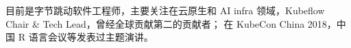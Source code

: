 

\begin{cvparagraph}
\begin{minipage}[t]{\textwidth}
目前是字节跳动软件工程师，主要关注在云原生和 AI infra 领域，Kubeflow Chair \& Tech Lead，曾经全球贡献第二的贡献者；
在 KubeCon China 2018，中国 R 语言会议等发表过主题演讲。
\end{minipage}
\end{cvparagraph}
